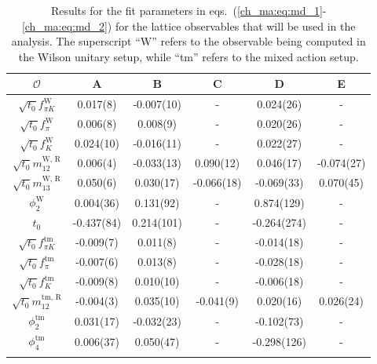 \begin{longtable}{c | c c c c c}
\label{ch_ma:tab:md}
    $\mathcal{O}$ & A & B & C & D & E \\
    \toprule
    $\sqrt{t_0}f_{\pi K}^{\textrm{W}}$ & 0.017(8) & -0.007(10) & - & 0.024(26) & - \\ 
    $\sqrt{t_0}f_{\pi}^{\textrm{W}}$ & 0.006(8) & 0.008(9) & - & 0.020(26) & - \\ 
    $\sqrt{t_0}f_{K}^{\textrm{W}}$ & 0.024(10) & -0.016(11) & - & 0.022(27) & - \\ 
    $\sqrt{t_0}m_{12}^{\textrm{W, R}}$ & 0.006(4) & -0.033(13) & 0.090(12) & 0.046(17) & -0.074(27) \\ 
    $\sqrt{t_0}m_{13}^{\textrm{W, R}}$ & 0.050(6) & 0.030(17) & -0.066(18) & -0.069(33) & 0.070(45) \\ 
    $\phi_2^{\textrm{W}}$ & 0.004(36) & 0.131(92) & - & 0.874(129) & - \\ 
    $t_0$ & -0.437(84) & 0.214(101) & - & -0.264(274) & - \\ 
    \midrule
    $\sqrt{t_0}f_{\pi K}^{\textrm{tm}}$ & -0.009(7) & 0.011(8) & - & -0.014(18) & - \\ 
    $\sqrt{t_0}f_{\pi}^{\textrm{tm}}$ & -0.007(6) & 0.013(8) & - & -0.028(18) & - \\ 
    $\sqrt{t_0}f_{K}^{\textrm{tm}}$ & -0.009(8) & 0.010(10) & - & -0.006(18) & - \\ 
    $\sqrt{t_0}m_{12}^{\textrm{tm, R}}$ & -0.004(3) & 0.035(10) & -0.041(9) & 0.020(16) & 0.026(24) \\ 
    $\phi_2^{\textrm{tm}}$ & 0.031(17) & -0.032(23) & - & -0.102(73) & - \\ 
    $\phi_4^{\textrm{tm}}$ & 0.006(37) & 0.050(47) & - & -0.298(126) & - \\ 
    \bottomrule
    \caption{Results for the fit parameters in eqs.~(\ref{ch_ma:eq:md_1}-\ref{ch_ma:eq:md_2}) for the lattice observables that will be used in the analysis. The superscript ``W'' refers to the observable being computed in the Wilson unitary setup, while ``tm'' refers to the mixed action setup.}
\end{longtable}

